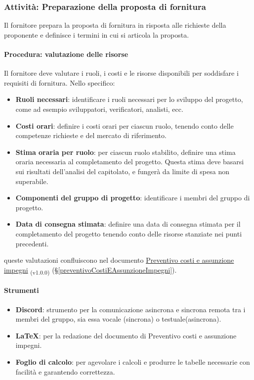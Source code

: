 \documentclass[a4paper,12pt]{article}
\newcommand{\ped}[1]{\textsubscript{#1}}
\begin{document}
\subsubsection{Attività: Preparazione della proposta di fornitura}\label{preparazionePropostaFornitura}
Il fornitore prepara la proposta di fornitura in risposta alle richieste della
proponente e definisce i termini in cui si articola la proposta.

\paragraph{Procedura: valutazione delle risorse}
Il fornitore deve valutare i ruoli, i costi e le risorse disponibili per
soddisfare i requisiti di fornitura. Nello specifico:
\begin{itemize}
    \item \textbf{Ruoli necessari}: identificare i ruoli necessari per lo sviluppo del progetto, come ad esempio sviluppatori, verificatori, analisti, ecc.
    \item \textbf{Costi orari}: definire i costi orari per ciascun ruolo, tenendo conto delle competenze richieste e del mercato di riferimento.
    \item \textbf{Stima oraria per ruolo}: per ciascun ruolo stabilito, definire una stima oraria necessaria al completamento del progetto. Questa stima deve basarsi sui risultati dell'analisi del capitolato, e fungerà da limite di spesa non superabile.
    \item \textbf{Componenti del gruppo di progetto}: identificare i membri del gruppo di progetto.
    \item \textbf{Data di consegna stimata}: definire una data di consegna stimata per il completamento del progetto tenendo conto delle risorse stanziate nei punti precedenti.
\end{itemize}
queste valutazioni confluiscono nel documento \href{https://7-zpus.github.io/Docs/assets/1_Candidatura/PreventivoCostiEAssunzioneImpegni.pdf}{Preventivo costi e assunzione impegni} \ped{(v1.0.0)} (§\ref{preventivoCostiEAssunzioneImpegni}).
\paragraph{Strumenti}
\begin{itemize}
    \item \textbf{Discord}: strumento per la comunicazione asincrona e sincrona remota tra i membri del gruppo, sia essa vocale (sincrona) o testuale(asincrona).
    \item \textbf{\LaTeX}: per la redazione del documento di Preventivo costi e assunzione impegni.
    \item \textbf{Foglio di calcolo}: per agevolare i calcoli e produrre le tabelle necessarie con facilità e garantendo correttezza.
\end{itemize}
\end{document}
